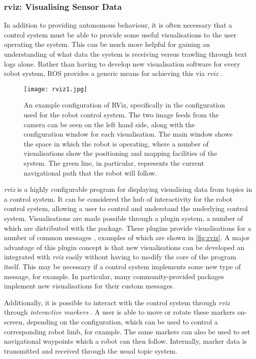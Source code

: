 \subsubsection{rviz: Visualising Sensor Data}

In addition to providing autonomous behaviour, it is often necessary that a control system must be able to provide some useful visualisations to the user operating the system. This can be much more helpful for gaining an understanding of what data the system is receiving versus trawling through text logs alone. Rather than having to develop new visualisation software for every robot system, ROS provides a generic means for achieving this via \emph{rviz} \cite{ros_wiki_rviz}.

\begin{figure}[!h]
    \centering
    \texttt{[image: rviz1.jpg]}
    \caption{An example configuration of RViz, specifically in the configuration used for the robot control system. The two image feeds from the camera can be seen on the left hand side, along with the configuration window for each visualisation. The main window shows the space in which the robot is operating, where a number of visualisations show the positioning and mapping facilities of the system. The green line, in particular, represents the current navigational path that the robot will follow.}
    \label{fig:rviz}
\end{figure}

\emph{rviz} is a highly configurable program for displaying visualising data from topics in a control system. It can be considered the hub of interactivity for the robot control system, allowing a user to control and understand the underlying control system. Visualisations are made possible through a plugin system, a number of which are distributed with the package. These plugins provide visualisations for a number of common messages \cite{ros_wiki_rviz_datatypes}, examples of which are shown in \autoref{fig:rviz}. A major advantage of this plugin concept is that new visualisations can be developed an integrated with \emph{rviz} easily without having to modify the core of the program itself. This may be necessary if a control system implements some new type of message, for example. In particular, many community-provided packages implement new visualisations for their custom messages.

Additionally, it is possible to interact with the control system through \emph{rviz} through \emph{interactive markers} \cite{ros_wiki_rviz_intmark}. A user is able to move or rotate these markers on-screen, depending on the configuration, which can be used to control a corresponding robot limb, for example. The same markers can also be used to set navigational waypoints which a robot can then follow. Internally, marker data is transmitted and received through the usual topic system.

